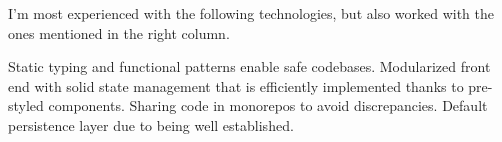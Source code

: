 
I'm most experienced with the following technologies,
but also worked with the ones mentioned in the right column.

\medskip

%
    {Static typing and functional patterns enable safe codebases.}
\smallskip
{}%
    {Modularized front end with solid state management
    that is efficiently implemented thanks to pre-styled components.}
\smallskip
{}%
    {Sharing code in monorepos to avoid discrepancies.}
\smallskip
{}%
    {Default persistence layer due to being well established.}
